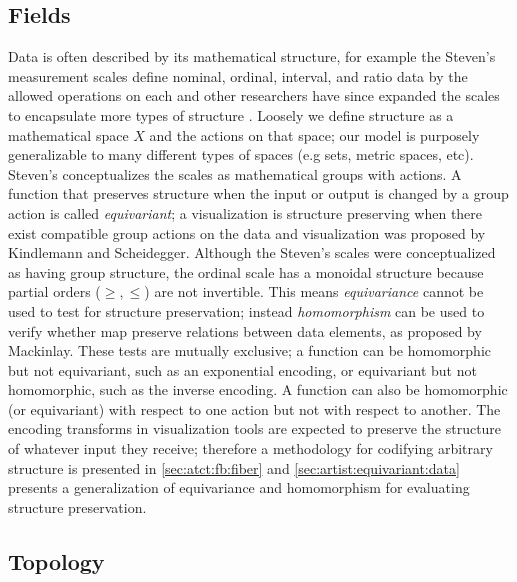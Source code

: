 \documentclass[review]{vgtc}
\theoremstyle{definition}
\theoremstyle{remark}
\begin{document}
\subsection{Fields}
\label{sec:related-work:equivariance}

Data is often described by its mathematical structure, for example the Steven's measurement scales define nominal, ordinal, interval, and ratio data by the allowed operations on each \cite{stevensTheoryScalesMeasurement1946} and other researchers have since expanded the scales to encapsulate more types of structure \cite{leaFormalizationMeasurementScale1971, thomasMathematizationNotMeasurement2014}. Loosely we define structure as a mathematical space $X$ and the actions on that space; our model is purposely generalizable to many different types of spaces (e.g sets, metric spaces, etc). Steven's conceptualizes the scales as mathematical groups with \textcolor{action}{actions}. A function that preserves structure when the input or output is changed by a group action is called \textit{equivariant}; a visualization is structure preserving when there exist compatible group actions on the data and visualization was proposed by Kindlemann and Scheidegger\cite{kindlmannAlgebraicProcessVisualization2014}. Although the Steven's scales were conceptualized as having group structure, the ordinal scale has a monoidal structure because partial orders ($\geq, \leq$) are not invertible. This means \textit{equivariance} cannot be used to test for structure preservation; instead \textit{homomorphism} can be used to verify whether map preserve relations between data elements, as proposed by Mackinlay\cite{mackinlayAutomaticDesignGraphical1987}. These tests are mutually exclusive; a function can be homomorphic but not equivariant, such as an exponential encoding, or equivariant but not homomorphic, such as the inverse encoding. A function can also be homomorphic (or equivariant) with respect to one action but not with respect to another. The encoding transforms in visualization tools are expected to preserve the structure of whatever input they receive; therefore a methodology for codifying arbitrary structure is presented in \autoref{sec:atct:fb:fiber} and \autoref{sec:artist:equivariant:data} presents a generalization of equivariance and homomorphism for evaluating structure preservation.

\subsection{Topology}
\label{sec:related-work:continuity}
\end{document}
